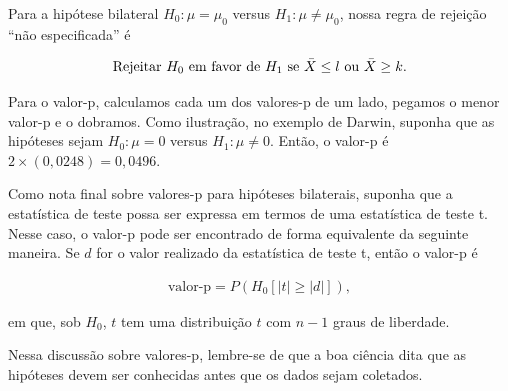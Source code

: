 \documentclass[12pt]{beamer}
\begin{document}
\begin{frame}{}
\begin{block}{}
\justifying
Para a hipótese bilateral $H_0 : \mu = \mu_0$ versus $H_1 : \mu \neq \mu_0$, nossa regra de rejeição ``não especificada'' é

\begin{align}
\text{Rejeitar } H_0 \text{ em favor de } H_1 \text{ se } \Bar{X} \leq l \text{ ou } \Bar{X} \geq k.
\end{align}

Para o valor-p, calculamos cada um dos valores-p de um lado, pegamos o menor valor-p e o dobramos. Como ilustração, no exemplo de Darwin, suponha que as hipóteses sejam $H_0 : \mu = 0$ versus $H_1 : \mu \neq 0$. Então, o valor-p é $2 \times (0,0248) = 0,0496$. 
\end{block}
\end{frame}

\begin{frame}{}
\begin{block}{}
\justifying
Como nota final sobre valores-p para hipóteses bilaterais, suponha que a estatística de teste possa ser expressa em termos de uma estatística de teste t. Nesse caso, o valor-p pode ser encontrado de forma equivalente da seguinte maneira. Se $d$ for o valor realizado da estatística de teste t, então o valor-p é

\begin{align}
\text{valor-p} = P(H_0 [|t| \geq |d|]), 
\end{align}

em que, sob $H_0$, $t$ tem uma distribuição $t$ com $n - 1$ graus de liberdade.
\end{block}
\pause
\begin{block}{}
\justifying
Nessa discussão sobre valores-p, lembre-se de que a boa ciência dita que as hipóteses devem ser conhecidas antes que os dados sejam coletados.
\end{block}
\end{frame}


\end{document}
